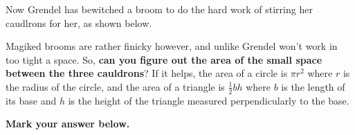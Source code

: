 


Now Grendel has bewitched a broom to do the hard work of stirring her
caudlrons for her, as shown below.

\begin{center}
\end{center}

Magiked brooms are rather finicky however, and unlike Grendel won't work
in too tight a space. So, \textbf{can you figure out the area of the small
space between the three cauldrons}? If it helps, the area of a circle is
\(\pi r^2\) where \(r\) is the radius of the circle, and the area of
a triangle is \(\frac{1}{2}bh\) where \(b\) is the length of its base
and \(h\) is the height of the triangle measured perpendicularly to the base.

\vspace{1em}

\textbf{Mark your answer below.}

